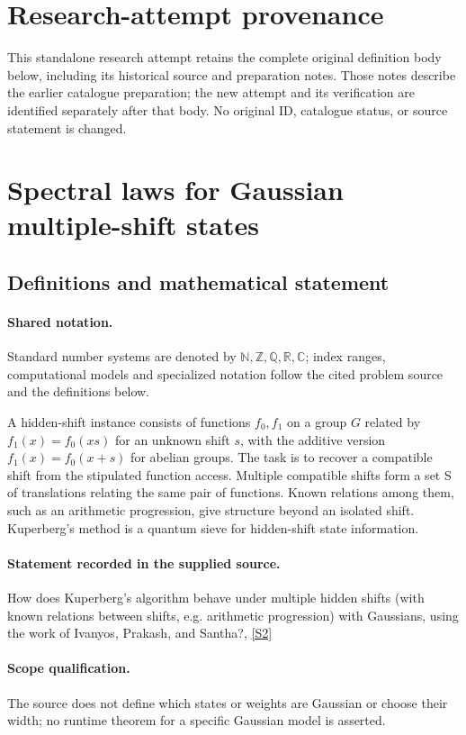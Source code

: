 \documentclass[11pt]{article}
\begin{document}
\section*{Research-attempt provenance}
This standalone research attempt retains the complete original definition body below,
including its historical source and preparation notes. Those notes describe the
earlier catalogue preparation; the new attempt and its verification are identified
separately after that body. No original ID, catalogue status, or source statement is changed.

\section{Spectral laws for Gaussian multiple-shift states}\label{statement}

\subsection{Definitions and mathematical statement}

\paragraph{Shared notation.}Standard number systems are denoted by $\mathbb N,\mathbb Z,\mathbb Q,\mathbb R,\mathbb C$; index ranges, computational models and specialized notation follow the cited problem source and the definitions below.


A hidden-shift instance consists of functions $f_0,f_1$ on a group $G$ related by $f_1(x)=f_0(xs)$ for an unknown shift $s$, with the additive version $f_1(x)=f_0(x+s)$ for abelian groups. The task is to recover a compatible shift from the stipulated function access. Multiple compatible shifts form a set S of translations relating the same pair of functions. Known relations among them, such as an arithmetic progression, give structure beyond an isolated shift. Kuperberg's method is a quantum sieve for hidden-shift state information.
\paragraph{Statement recorded in the supplied source.}
How does Kuperberg's algorithm behave under multiple hidden shifts (with known relations between shifts, e.g. arithmetic progression) with Gaussians, using the work of Ivanyos, Prakash, and Santha?, \href{http://aimpl.org/quantumalg/4/}{[S2]}
\paragraph{Scope qualification.}
The source does not define which states or weights are Gaussian or choose their width; no runtime theorem for a specific Gaussian model is asserted.
\end{document}
